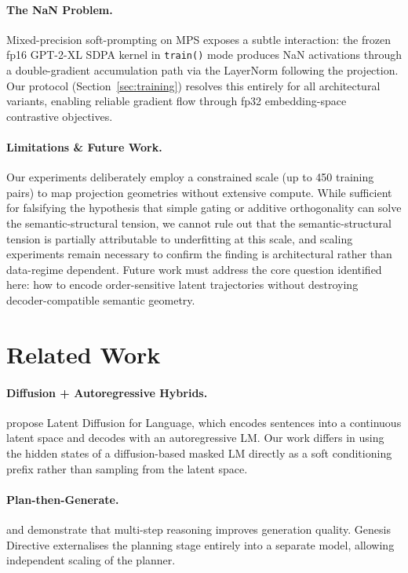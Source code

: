 \documentclass[11pt]{article}
\begin{document}
\paragraph{The NaN Problem.}
Mixed-precision soft-prompting on MPS exposes a subtle interaction: the frozen
fp16 GPT-2-XL SDPA kernel in \texttt{train()} mode produces NaN activations
through a double-gradient accumulation path via the LayerNorm following the
projection.
Our protocol (Section~\ref{sec:training}) resolves this entirely for all
architectural variants, enabling reliable gradient flow through fp32
embedding-space contrastive objectives.

\paragraph{Limitations \& Future Work.}
Our experiments deliberately employ a constrained scale (up to 450 training pairs) to map projection geometries without extensive compute. While sufficient for falsifying the hypothesis that simple gating or additive orthogonality can solve the semantic-structural tension, we cannot rule out that the semantic-structural tension is partially attributable to underfitting at this scale, and scaling experiments remain necessary to confirm the finding is architectural rather than data-regime dependent.
Future work must address the core question identified here: how to encode order-sensitive latent trajectories without destroying decoder-compatible semantic geometry.

\section{Related Work}
\label{sec:related}

\paragraph{Diffusion + Autoregressive Hybrids.}
\citet{lovelace2023latent} propose Latent Diffusion for Language, which encodes
sentences into a continuous latent space and decodes with an autoregressive LM.
Our work differs in using the hidden states of a diffusion-based masked LM
directly as a soft conditioning prefix rather than sampling from the latent space.

\paragraph{Plan-then-Generate.}
\citet{yao2023tree} and \citet{wei2022chain} demonstrate that multi-step
reasoning improves generation quality.
Genesis Directive externalises the planning stage entirely into a separate model,
allowing independent scaling of the planner.
\end{document}
